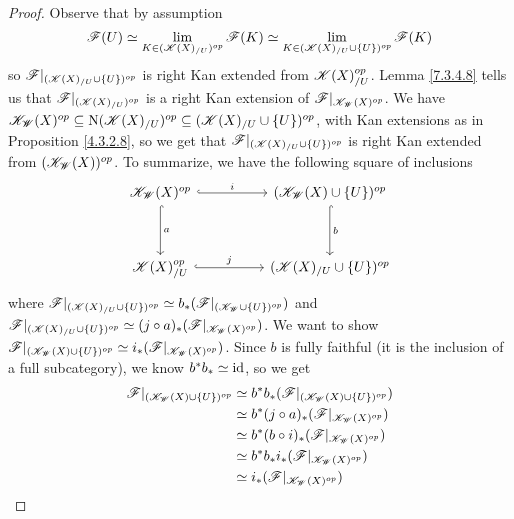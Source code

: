 \documentclass[../../thesis.tex]{subfiles}
\begin{document}
\begin{proof}
    Observe that by assumption
    \[
        \mathscr{F}(U)  \simeq \lim_{K\in (\mathscr{K}(X)_{/U})^{op}} \mathscr{F}(K) \simeq \lim_{K\in (\mathscr{K}(X)_{/U} \cup \{U\})^{op}} \mathscr{F}(K)
    \]
    so $\mathscr{F}|_{(\mathscr{K}(X)_{/U} \cup \{U\})^{op}}$ is right Kan extended from $\mathscr{K}(X)_{/U}^{op}$.
    Lemma \ref{7.3.4.8} tells us that $\mathscr{F}|_{(\mathscr{K}(X)_{/U})^{op}}$ is a right Kan extension of $\mathscr{F}|_{\mathscr{K}_{\mathscr{W}}(X)^{op}}$.
    We have ${\mathscr{K}_{\mathscr{W}}(X)^{op} \subseteq\mathrm{N}(\mathscr{K}(X)_{/U})^{op} \subseteq (\mathscr{K}(X)_{/U} \cup \{U\})^{op}}$, with Kan extensions as in Proposition \ref{4.3.2.8}, so we get that ${\mathscr{F}|_{(\mathscr{K}(X)_{/U} \cup \{U\})^{op}}}$ is right Kan extended from ${(\mathscr{K}_{\mathscr{W}}(X))^{op}}$.
    To summarize, we have the following square of inclusions
    \[\begin{tikzcd}
            {\K_{\W}(X)^{op}} && {(\K_{\W}(X)\cup \{U\})^{op}} \\
            \\
            {\K(X)_{/U}^{op}} && {(\K(X)_{/U} \cup \{U\})^{op}}
            \arrow["{b}", hook, from=1-3, to=3-3]
            \arrow["{j}", hook, from=3-1, to=3-3]
            \arrow["{a}", hook, from=1-1, to=3-1]
            \arrow["{i}" ,hook, from=1-1, to=1-3]
        \end{tikzcd}\]
    where $\mathscr{F}|_{(\mathscr{K}(X)_{/U} \cup \{ U \})^{op}} \simeq b_*(\mathscr{F}|_{(\mathscr{K}_{\mathscr{W}} \cup \{U\})^{op}})$ and $\mathscr{F}|_{(\mathscr{K}(X)_{/U} \cup \{U\})^{op}} \simeq (j\circ a)_*(\mathscr{F}|_{\mathscr{K}_{\mathscr{W}}(X)^{op}})$.
    We want to show $\mathscr{F}|_{(\mathscr{K}_{\mathscr{W}}(X) \cup \{U\})^{op}} \simeq i_*(\mathscr{F}|_{\mathscr{K}_{\mathscr{W}}(X)^{op}})$.
    Since $b$ is fully faithful (it is the inclusion of a full subcategory), we know $b^*b_* \simeq \operatorname{id}$, so we get
    \begin{align}
        \mathscr{F}|_{(\mathscr{K}_{\mathscr{W}}(X)\cup \{U\})^{op}} & \simeq b^*b_*(\mathscr{F}|_{(\mathscr{K}_{\mathscr{W}}(X)\cup \{U\})^{op}}) \\
                                        & \simeq b^*(j\circ a)_* (\mathscr{F}|_{\mathscr{K}_{\mathscr{W}}(X)^{op}})   \\
                                        & \simeq b^*(b \circ i)_*(\mathscr{F}|_{\mathscr{K}_{\mathscr{W}}(X)^{op}})   \\
                                        & \simeq b^*b_*i_*(\mathscr{F}|_{\mathscr{K}_{\mathscr{W}}(X)^{op}})          \\
                                        & \simeq i_*(\mathscr{F}|_{\mathscr{K}_{\mathscr{W}}(X)^{op}})
    \end{align}
\end{proof}
\end{document}
